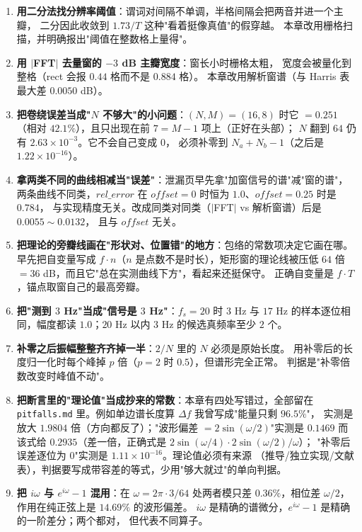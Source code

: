 \begin{enumerate}
        偏 $0.25$ 格就到 $0.3265$（$-9.72$ dB）。泄漏的原因是"信号周期与 $T$ 不成整数比"。
  \item \textbf{用二分法找分辨率阈值}：谓词对间隔不单调，半格间隔会把两音并进一个主瓣，
        二分因此收敛到 $1.73/T$ 这种"看着挺像真值"的假穿越。
        本章改用栅格扫描，并明确报出"阈值在整数格上量得"。
  \item \textbf{用 $|$FFT$|$ 去量窗的 $-3$ dB 主瓣宽度}：窗长小时栅格太粗，
        宽度会被量化到整格（rect 会报 $0.44$ 格而不是 $0.884$ 格）。
        本章改用解析窗谱（与 Harris 表最大差 $0.0050$ dB）。
  \item \textbf{把卷绕误差当成"$N$ 不够大"的小问题}：$(N,M)=(16,8)$ 时它 $=0.251$
        （相对 $42.1\%$），且只出现在前 $7=M-1$ 项上（正好在头部）；
        $N$ 翻到 $64$ 仍有 $2.63\times10^{-3}$。它不会自己变成 $0$，
        必须补零到 $N_a+N_b-1$（之后是 $1.22\times10^{-16}$）。
  \item \textbf{拿两类不同的曲线相减当"误差"}：泄漏页早先拿"加窗信号的谱"减"窗的谱"，
        两条曲线不同类，$rel\_error$ 在 $offset=0$ 时恒为 $1.0$、$offset=0.25$ 时是 $0.784$，
        与实现精度无关。改成同类对同类（$|$FFT$|$ vs 解析窗谱）后是 $0.0055\sim0.0132$，
        且与 $offset$ 无关。
  \item \textbf{把理论的旁瓣线画在"形状对、位置错"的地方}：包络的常数项决定它画在哪。
        早先把自变量写成 $f\cdot n$（$n$ 是点数不是时长），矩形窗的理论线被压低
        $64$ 倍 $=36$ dB，而且它"总在实测曲线下方"，看起来还挺保守。
        正确自变量是 $f\cdot T$，锚点取窗自己的最高旁瓣。
  \item \textbf{把"测到 $3$ Hz"当成"信号是 $3$ Hz"}：$f_s=20$ 时 $3$ Hz 与 $17$ Hz
        的样本逐位相同，幅度都读 $1.0$；$20$ Hz 以内 $3$ Hz 的候选真频率至少 $2$ 个。
  \item \textbf{补零之后振幅整整齐齐掉一半}：$2/N$ 里的 $N$ 必须是原始长度。
        用补零后的长度归一化时每个峰掉 $p$ 倍（$p=2$ 时 $0.5$），但谱形完全正常。
        判据是"补零倍数改变时峰值不动"。
  \item \textbf{把断言里的"理论值"当成抄来的常数}：本章有四处写错过，全部留在
        \texttt{pitfalls.md} 里。例如单边谱长度算 $\Delta f$ 我曾写成"能量只剩 $96.5\%$"，
        实测是放大 $1.9804$ 倍（方向都反了）；"波形偏差 $=2\sin(\omega/2)$"实测是
        $0.1469$ 而该式给 $0.2935$（差一倍，正确式是 $2\sin(\omega/4)\cdot2\sin(\omega/2)/\omega$）；
        "补零后误差逐位为 $0$"实测是 $1.11\times10^{-16}$。理论值必须有来源
        （推导/独立实现/文献表），判据要写成带容差的等式，少用"够大就过"的单向判据。
  \item \textbf{把 $i\omega$ 与 $e^{i\omega}-1$ 混用}：在 $\omega=2\pi\cdot3/64$ 处两者模只差
        $0.36\%$，相位差 $\omega/2$，作用在纯正弦上是 $14.69\%$ 的波形偏差。
        $i\omega$ 是精确的谱微分，$e^{i\omega}-1$ 是精确的一阶差分；两个都对，
        但代表不同算子。
\end{enumerate}
